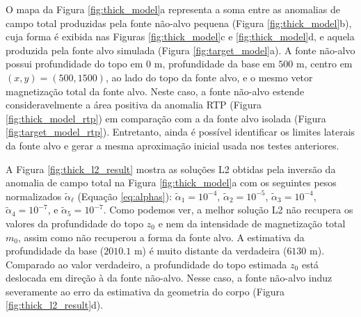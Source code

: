 O mapa da Figura \ref{fig:thick_model}a representa a soma entre as anomalias de campo total produzidas pela fonte não-alvo pequena (Figura \ref{fig:thick_model}b), cuja forma é exibida nas Figuras \ref{fig:thick_model}c e \ref{fig:thick_model}d, e aquela produzida pela fonte alvo simulada (Figura \ref{fig:target_model}a).
A fonte não-alvo possui profundidade do topo em $0$ m, profundidade da base em $500$ m, 
centro em $(x, y) = (500, 1500)$, ao lado do topo da fonte alvo, e o mesmo vetor magnetização total da fonte alvo.
Neste caso, a fonte não-alvo estende consideravelmente a área positiva da anomalia RTP (Figura \ref{fig:thick_model_rtp}) em comparação com a da fonte alvo isolada (Figura \ref{fig:target_model_rtp}). Entretanto, ainda é possível identificar os limites laterais da fonte alvo e gerar a mesma aproximação inicial usada nos testes anteriores.


A Figura \ref{fig:thick_l2_result} mostra as soluções L2 obtidas pela inversão da anomalia de campo total na Figura \ref{fig:thick_model}a
com os seguintes pesos normalizados $\tilde{\alpha}_{\ell}$ (Equação \ref{eq:alphas}):
$\tilde{\alpha}_{1} = 10^{-4}$, $\tilde{\alpha}_{2} = 10^{-5}$, 
$\tilde{\alpha}_{3} = 10^{-4}$, $\tilde{\alpha}_{4} = 10^{-7}$, e 
$\tilde{\alpha}_{5} = 10^{-7}$.
Como podemos ver, a melhor solução L2 não recupera os valores da profundidade do topo $z_{0}$ e nem da intensidade de magnetização total $m_{0}$, assim como não recuperou a forma da fonte alvo.
A estimativa da profundidade da base ($2010.1$ m) é muito distante da verdadeira ($6130$ m).
Comparado ao valor verdadeiro, a profundidade do topo estimada $z_{0}$ está deslocada em direção à da fonte não-alvo.
Nesse caso, a fonte não-alvo induz severamente ao erro da estimativa da geometria do corpo (Figura \ref{fig:thick_l2_result}d).

